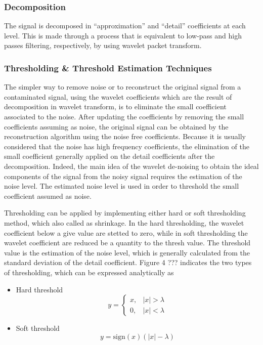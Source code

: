 \documentclass[12pt, a4paper, twoside]{report}
\begin{document}
\subsubsection{Decomposition}
The signal is decomposed in ``approximation'' and ``detail'' coefficients at each level. This is made through a process that is equivalent to low-pass and high passes filtering, respectively, by using wavelet packet transform.

\subsubsection{Thresholding \& Threshold Estimation Techniques}
The simpler way to remove noise or to reconstruct the original signal from a contaminated signal, using the wavelet coefficients which are the result of decomposition in wavelet transform, is to eliminate the small coefficient associated to the noise. After updating the coefficients by removing the small coefficients assuming as noise, the original signal can be obtained by the reconstruction algorithm using the noise free coefficients. Because it is usually considered that the noise has high frequency coefficients, the elimination of the small coefficient generally applied on the detail coefficients after the decomposition. Indeed, the main idea of the wavelet de-noising to obtain the ideal components of the signal from the noisy signal requires the estimation of the noise level. The estimated noise level is used in order to threshold the small coefficient assumed as noise.

Thresholding can be applied by implementing either hard or soft thresholding method, which also called as shrinkage. In the hard thresholding, the wavelet coefficient below a give value are stetted to zero, while in soft thresholding the wavelet coefficient are reduced be a quantity to the thresh value.  The threshold value is the estimation of the noise level, which is generally calculated from the standard deviation of the detail coefficient. Figure 4 ??? indicates the two types of thresholding, which can be expressed analytically as
\begin{itemize}
\item Hard threshold
\begin{equation*}
y = \begin{cases}
x, & \left | x  \right | > \lambda \\ 
0, & \left | x  \right | < \lambda
\end{cases}
\end{equation*}
\item Soft threshold
\begin{equation*}
y = \text{sign}(x) \left ( \left | x \right | - \lambda \right )
\end{equation*}
\end{itemize}
\end{document}
